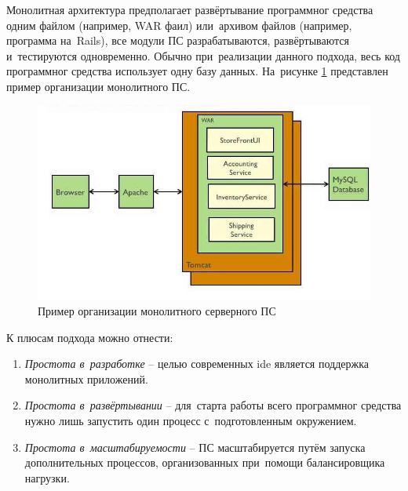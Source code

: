 \subsubsection {}
\label{sec:analysis:research:backArch:monolith}

Монолитная архитектура предполагает развёртывание программног средства одним файлом (например, WAR фаил) или~архивом файлов (например, программа на~Rails), все модули ПС разрабатываются, развёртываются и~тестируются одновременно. Обычно при~реализации данного подхода, весь код программног средства использует одну базу данных. На~рисунке \ref{sec:analysis:research:arch:back:monolith} представлен пример организации монолитного ПС\cite{microservices:ma}.

\begin{figure}[h]
  \centering
    \includegraphics[width=1\textwidth]{inc/img/backend-monolith.jpg}
  \caption{Пример организации монолитного серверного ПС}
  \label{sec:analysis:research:arch:back:monolith}
\end{figure}

К плюсам подхода можно отнести:

\begin{enumerate}
	\item \emph{Простота в~разработке} -- целью современных \gls{ide} является поддержка монолитных приложений.
	\item \emph{Простота в~развёртывании} -- для~старта работы всего программног средства нужно лишь запустить один процесс с~подготовленным окружением.
	\item \emph{Простота в~масштабируемости} -- ПС масштабируется путём запуска дополнительных процессов, организованных при~помощи балансировщика нагрузки.
\end{enumerate}

